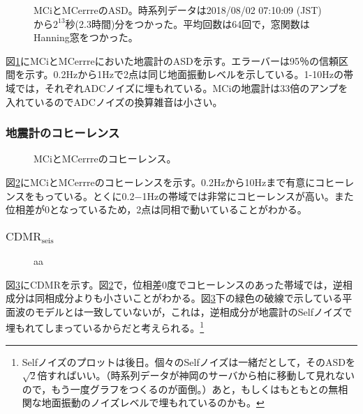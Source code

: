 \begin{figure}[H]
  \begin{center}
  \end{center}
  \caption{MCiとMCerrreのASD。時系列データは2018/08/02 07:10:09 (JST)から$2^{13}$秒(2.3時間)分をつかった。平均回数は64回で，窓関数はHanning窓をつかった。}\label{img:img_asd_imc}
\end{figure}

図\ref{img:img_asd_imc}にMCiとMCerrreにおいた地震計のASDを示す。エラーバーは95％の信頼区間を示す。0.2Hzから1Hzで2点は同じ地面振動レベルを示している。1-10Hzの帯域では，それぞれADCノイズに埋もれている。MCiの地震計は33倍のアンプを入れているのでADCノイズの換算雑音は小さい。


\subsubsection{地震計のコヒーレンス}

\begin{figure}[H]
  \begin{center}
  \end{center}
  \caption{MCiとMCerrreのコヒーレンス。}\label{img:img_coherence_imc}
\end{figure}

図\ref{img:img_coherence_imc}にMCiとMCerrreのコヒーレンスを示す。0.2Hzから10Hzまで有意にコヒーレンスをもっている。とくに0.2−1Hzの帯域では非常にコヒーレンスが高い。また位相差が0となっているため，2点は同相で動いていることがわかる。



\subsubsection{$\mathrm{CDMR_{seis}}$}
\begin{figure}[H]
  \begin{center}
  \end{center}
  \caption{aa}\label{img:img_cdmr_imc}
\end{figure}
図\ref{img:img_cdmr_imc}にCDMRを示す。図\ref{img:img_coherence_imc}で，位相差0度でコヒーレンスのあった帯域では，逆相成分は同相成分よりも小さいことがわかる。図\ref{img:img_cdmr_imc}下の緑色の破線で示している平面波のモデルとは一致していないが，これは，逆相成分が地震計のSelfノイズで埋もれてしまっているからだと考えられる。\footnote[12]{Selfノイズのプロットは後日。個々のSelfノイズは一緒だとして，そのASDを$\sqrt{2}$倍すればいい。（時系列データが神岡のサーバから柏に移動して見れないので，もう一度グラフをつくるのが面倒。）あと，もしくはもともとの無相関な地面振動のノイズレベルで埋もれているのかも。}






